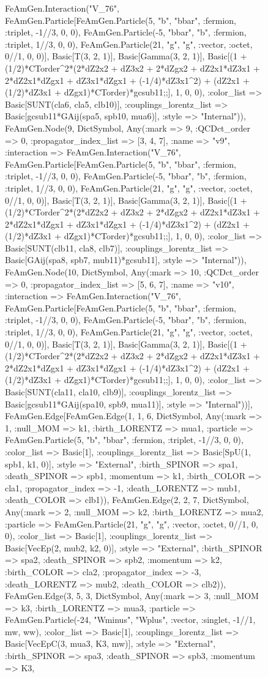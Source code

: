 \documentclass{revtex4}
\begin{document}
\begin{figure}[!htb]
\begin{center}
{FeAmGen.Interaction("V_76", FeAmGen.Particle[FeAmGen.Particle(5, "b", "bbar", :fermion, :triplet, -1//3, 0, 0), FeAmGen.Particle(-5, "bbar", "b", :fermion, :triplet, 1//3, 0, 0), FeAmGen.Particle(21, "g", "g", :vector, :octet, 0//1, 0, 0)], Basic[T(3, 2, 1)], Basic[Gamma(3, 2, 1)], Basic[(1 + (1/2)*CTorder^2*(2*dZ2x2 + dZ3x2 + 2*dZgx2 + dZ2x1*dZ3x1 + 2*dZ2x1*dZgx1 + dZ3x1*dZgx1 + (-1/4)*dZ3x1^2) + (dZ2x1 + (1/2)*dZ3x1 + dZgx1)*CTorder)*gcsub11;;], 1, 0, 0), :color_list => Basic[SUNT(cla6, cla5, clb10)], :couplings_lorentz_list => Basic[gcsub11*GAij(spa5, spb10, mua6)], :style => "Internal")), FeAmGen.Node(9, Dict{Symbol, Any}(:mark => 9, :QCDct_order => 0, :propagator_index_list => [3, 4, 7], :name => "v9", :interaction => FeAmGen.Interaction("V_76", FeAmGen.Particle[FeAmGen.Particle(5, "b", "bbar", :fermion, :triplet, -1//3, 0, 0), FeAmGen.Particle(-5, "bbar", "b", :fermion, :triplet, 1//3, 0, 0), FeAmGen.Particle(21, "g", "g", :vector, :octet, 0//1, 0, 0)], Basic[T(3, 2, 1)], Basic[Gamma(3, 2, 1)], Basic[(1 + (1/2)*CTorder^2*(2*dZ2x2 + dZ3x2 + 2*dZgx2 + dZ2x1*dZ3x1 + 2*dZ2x1*dZgx1 + dZ3x1*dZgx1 + (-1/4)*dZ3x1^2) + (dZ2x1 + (1/2)*dZ3x1 + dZgx1)*CTorder)*gcsub11;;], 1, 0, 0), :color_list => Basic[SUNT(clb11, cla8, clb7)], :couplings_lorentz_list => Basic[GAij(spa8, spb7, mub11)*gcsub11], :style => "Internal")), FeAmGen.Node(10, Dict{Symbol, Any}(:mark => 10, :QCDct_order => 0, :propagator_index_list => [5, 6, 7], :name => "v10", :interaction => FeAmGen.Interaction("V_76", FeAmGen.Particle[FeAmGen.Particle(5, "b", "bbar", :fermion, :triplet, -1//3, 0, 0), FeAmGen.Particle(-5, "bbar", "b", :fermion, :triplet, 1//3, 0, 0), FeAmGen.Particle(21, "g", "g", :vector, :octet, 0//1, 0, 0)], Basic[T(3, 2, 1)], Basic[Gamma(3, 2, 1)], Basic[(1 + (1/2)*CTorder^2*(2*dZ2x2 + dZ3x2 + 2*dZgx2 + dZ2x1*dZ3x1 + 2*dZ2x1*dZgx1 + dZ3x1*dZgx1 + (-1/4)*dZ3x1^2) + (dZ2x1 + (1/2)*dZ3x1 + dZgx1)*CTorder)*gcsub11;;], 1, 0, 0), :color_list => Basic[SUNT(cla11, cla10, clb9)], :couplings_lorentz_list => Basic[gcsub11*GAij(spa10, spb9, mua11)], :style => "Internal"))], FeAmGen.Edge[FeAmGen.Edge(1, 1, 6, Dict{Symbol, Any}(:mark => 1, :null_MOM => k1, :birth_LORENTZ => mua1, :particle => FeAmGen.Particle(5, "b", "bbar", :fermion, :triplet, -1//3, 0, 0), :color_list => Basic[1], :couplings_lorentz_list => Basic[SpU(1, spb1, k1, 0)], :style => "External", :birth_SPINOR => spa1, :death_SPINOR => spb1, :momentum => k1, :birth_COLOR => cla1, :propagator_index => -1, :death_LORENTZ => mub1, :death_COLOR => clb1)), FeAmGen.Edge(2, 2, 7, Dict{Symbol, Any}(:mark => 2, :null_MOM => k2, :birth_LORENTZ => mua2, :particle => FeAmGen.Particle(21, "g", "g", :vector, :octet, 0//1, 0, 0), :color_list => Basic[1], :couplings_lorentz_list => Basic[VecEp(2, mub2, k2, 0)], :style => "External", :birth_SPINOR => spa2, :death_SPINOR => spb2, :momentum => k2, :birth_COLOR => cla2, :propagator_index => -3, :death_LORENTZ => mub2, :death_COLOR => clb2)), FeAmGen.Edge(3, 5, 3, Dict{Symbol, Any}(:mark => 3, :null_MOM => k3, :birth_LORENTZ => mua3, :particle => FeAmGen.Particle(-24, "Wminus", "Wplus", :vector, :singlet, -1//1, mw, ww), :color_list => Basic[1], :couplings_lorentz_list => Basic[VecEpC(3, mua3, K3, mw)], :style => "External", :birth_SPINOR => spa3, :death_SPINOR => spb3, :momentum => K3, }
\end{center}
\end{figure}
\end{document}
